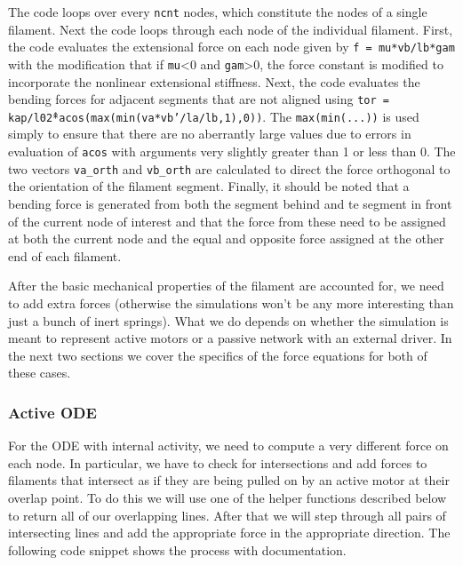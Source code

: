 The code loops over every \texttt{ncnt} nodes, which constitute the nodes of a single filament.  Next the code loops through each node of the individual filament.  First, the code evaluates the extensional force on each node given by \texttt{f = mu*vb/lb*gam} with the modification that if \texttt{mu}<0 and \texttt{gam}>0, the force constant is modified to incorporate the nonlinear extensional stiffness.  Next, the code evaluates the bending forces for adjacent segments that are not aligned using \texttt{tor = kap/l0\^2*acos(max(min(va*vb'/la/lb,1),0))}.  The \texttt{max(min(...))} is used simply to ensure that there are no aberrantly large values due to errors in evaluation of \texttt{acos} with arguments very slightly greater than 1 or less than 0.   The two vectors \texttt{va\_orth} and \texttt{vb\_orth} are calculated to direct the force orthogonal to the orientation of the filament segment.  Finally, it should be noted that a bending force is generated from both the segment behind and te segment in front of the current node of interest and that the force from these need to be assigned at both the current node and the equal and opposite force assigned at the other end of each filament.

After the basic mechanical properties of the filament are accounted for, we need to add extra forces (otherwise the simulations won't be any more interesting than just a bunch of inert springs).  What we do depends on whether the simulation is meant to represent active motors or a passive network with an external driver.  In the next two sections we cover the specifics of the force equations for both of these cases.

\subsubsection{Active ODE}

For the ODE with internal activity, we need to compute a very different force on each node.  In particular, we have to check for intersections and add forces to filaments that intersect as if they are being pulled on by an active motor at their overlap point.  To do this we will use one of the helper functions described below to return all of our overlapping lines.  After that we will step through all pairs of intersecting lines and add the appropriate force in the appropriate direction.  The following code snippet shows the process with documentation.  

